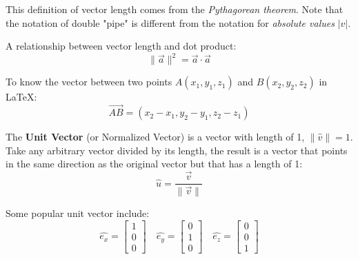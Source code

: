 This definition of vector length comes from the \textit{Pythagorean theorem}. Note that the notation of double "pipe" is different from the notation for \textit{absolute values} $|v|$.

A relationship between vector length and dot product: $$\|\vec{a}\| ^2=\vec{a}\cdot\vec{a}$$

To know the vector between two points $A(x_1,y_1,z_1)$ and $B(x_2,y_2,z_2)$ in \LaTeX: $$\overrightarrow{AB} = (x_2 - x_1, y_2 - y_1, z_2 - z_1)$$

The \textbf{Unit Vector} (or Normalized Vector) is a vector with length of 1, $\|\widehat{v}\| = 1$. Take any arbitrary vector divided by its length, the result is a vector that points in the same direction as the original vector but that has a length of 1: $$\widehat{u} = \frac{\vec{v}}{\|\vec{v}\|}$$

Some popular unit vector include:$$
\widehat{e_x}=\begin{bmatrix}
1\\0\\0
\end{bmatrix}
\quad
\widehat{e_y}=\begin{bmatrix}
0\\1\\0
\end{bmatrix}
\quad
\widehat{e_z}=\begin{bmatrix}
0\\0\\1
\end{bmatrix}
$$
